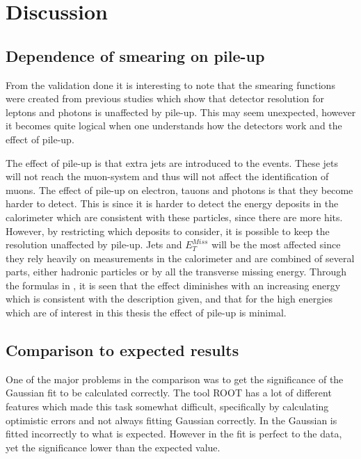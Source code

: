\newpage
\section{Discussion}\label{chap:vali:sec:dis}
\subsection{Dependence of smearing on pile-up}\label{chap:vali:sec:dis:subsec:smearindep}
From the validation done it is interesting to note that the smearing functions were created from previous studies \citep{Electronperf:2011, ATLAS:LOI2} which show that detector resolution for leptons and photons is unaffected by pile-up. This may seem unexpected, however it becomes quite logical when one understands how the detectors work and the effect of pile-up.

The effect of pile-up is that extra jets are introduced to the events. These jets will not reach the muon-system and thus will not affect the identification of muons. The effect of pile-up on electron, tauons and photons is that they become harder to detect. This is since it is harder to detect the energy deposits in the calorimeter which are consistent with these particles, since there are more hits. However, by restricting which deposits to consider, it is possible to keep the resolution unaffected by pile-up. Jets and $E_T^{Miss}$ will be the most affected since they rely heavily on measurements in the calorimeter and are combined of several parts, either hadronic particles or by all the transverse missing energy. Through the formulas in , it is seen that the effect diminishes with an increasing energy which is consistent with the description given, and that for the high energies which are of interest in this thesis the effect of pile-up is minimal. 

\subsection{Comparison to expected results}\label{sec:dis:subsec:comp}
One of the major problems in the comparison was to get the significance of the Gaussian fit to be calculated correctly. The tool ROOT has a lot of different features which made this task somewhat difficult, specifically by calculating optimistic errors and not always fitting Gaussian correctly. In  the Gaussian is fitted incorrectly to what is expected. However in  the fit is perfect to the data, yet the significance lower than the expected value.

